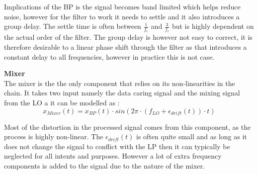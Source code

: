 Implications of the BP is the signal becomes band limited which helps reduce noise, however for the filter to work it needs to settle and it also introduces a group delay. The settle time is often between $\frac{1}{f_c}$ and $\frac{3}{f_c}$%
but is highly dependent on the actual order of the filter. The group delay is however not easy to correct, it is therefore desirable to a linear phase shift through the filter as that introduces a constant delay to all frequencies, however in practice this is not case. 


\textbf{Mixer}\\
The mixer is the the only component that relies on its non-linearities in the chain. It takes two input namely the data caring signal and the mixing signal from the \gls{LO} a it can be modelled as \citep[p. 12]{Mixer}:
\begin{equation}
x_{Mixer}(t) = x_{BP}(t) \cdot sin\left(2\pi\cdot (f_{LO}+\epsilon_{drift}(t)) \cdot t\right)
\end{equation}
\begin{where}
\end{where}


Most of the distortion in the processed signal comes from this component, as the process is highly non-linear. The $\epsilon_{drift}(t)$ is often quite small and as long as it does not change the signal to conflict with the LP then it can typically be neglected for all intents and purposes. However a lot of extra frequency components is added to the signal due to the nature of the mixer.



